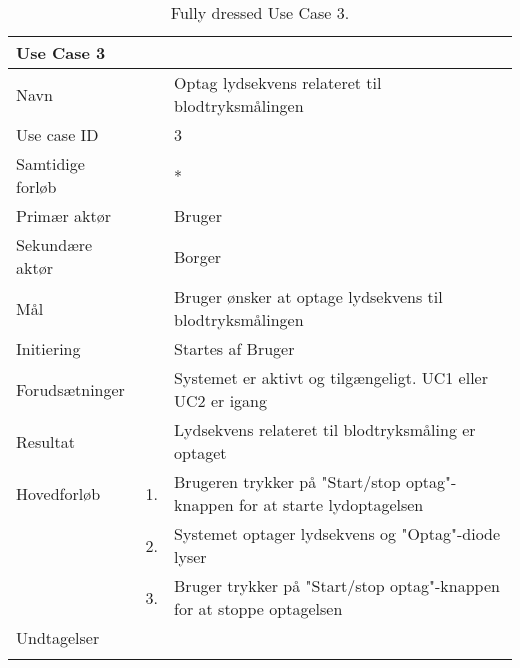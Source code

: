 \begin{longtabu} to  %
    {\large \textbf{Use Case 3}} && \\
    \toprule
    Navn &&    Optag lydsekvens relateret til blodtryksmålingen\\
    Use case ID &&    3\\
    Samtidige forløb &&   *\\
    Primær aktør &&    Bruger\\
    Sekundære aktør &&	Borger \\
    Mål &&    Bruger ønsker at optage lydsekvens til blodtryksmålingen\\
    Initiering &&	Startes af Bruger\\
    Forudsætninger &&  Systemet er aktivt og tilgængeligt. UC1 eller UC2 er igang  \\
    Resultat &&		Lydsekvens relateret til blodtryksmåling er optaget                 \\ \midrule
    Hovedforløb &    1. &    Brugeren trykker på "Start/stop optag"\--knappen for at starte lydoptagelsen\\[-1ex]   						 	
                &    2. &    Systemet optager lydsekvens og "Optag"\--diode lyser\\[-1ex]
                &    3.	&	 Bruger trykker på "Start/stop optag"\--knappen for at stoppe optagelsen\newline\\ \midrule
                
    Undtagelser &     &      \\ \bottomrule
\caption{Fully dressed Use Case 3.}
\label{UC3}
\end{longtabu}


